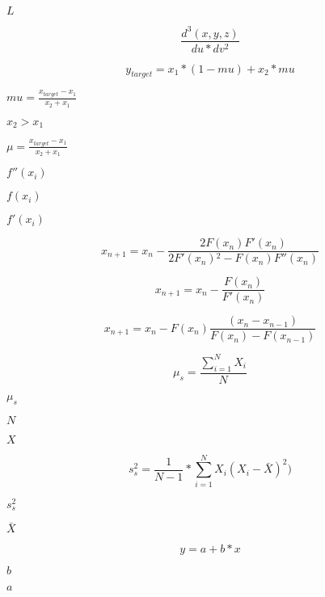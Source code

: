 \documentclass{article}
\begin{document}
$ L $
\pagebreak

\[ \frac{ d^{ 3 } ( x, y, z ) } { du * dv^{ 2 } } \]
\pagebreak

\[ y_{target} = x_{1} * ( 1 - mu ) + x_{2} * mu \]
\pagebreak

$ mu = \frac{ x_{target} - x_{1} } { x_{2} + x_{1} } $
\pagebreak

$ x_{2} > x_{1} $
\pagebreak

$ \mu = \frac{ x_{target} - x_{1} } { x_{2} + x_{1} } $
\pagebreak

$f''(x_i)$
\pagebreak

$f(x_i)$
\pagebreak

$f'(x_i)$
\pagebreak

\[ x_{n+1} = x_n-\frac{2 F\left(x_n\right) F'\left(x_n\right)} {2 F'\left(x_n\right){}^2-F\left(x_n\right) F''\left(x_n\right)} \]
\pagebreak

\[ x_{n+1} = x_n - \frac{F\left(x_n\right)}{F'\left(x_n\right)} \]
\pagebreak

\[ x_{n+1} = x_n - F\left(x_n\right) \frac{\left(x_n - x_{n-1}\right)} {F\left(x_n\right) - F\left(x_{n-1}\right)} \]
\pagebreak

\[ \mu_{s} = \frac{ \sum_{i=1}^{N} X_{i} } { N } \]
\pagebreak

$\mu_{s}$
\pagebreak

$ N $
\pagebreak

$ X $
\pagebreak

\[ s^{2}_{s} = \frac{ 1 }{ N - 1 } * \sum_{i=1}^{N} X_{i} ( X_{i} - \bar{ X } )^{ 2 } ) \]
\pagebreak

$ s^{2}_{s} $
\pagebreak

$ \bar{ X } $
\pagebreak

\[ y = a + b * x \]
\pagebreak

$ b $
\pagebreak

$ a $
\pagebreak
\end{document}
